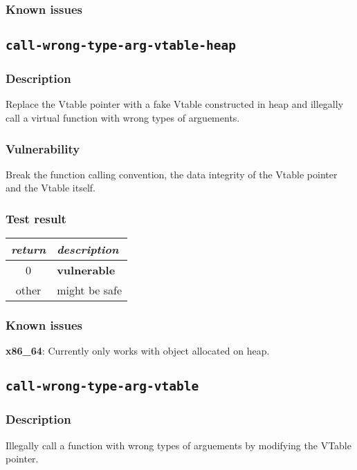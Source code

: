 \documentclass[a4paper]{book}
\begin{document}
\subsubsection{Known issues}

\newpage
\subsection{\texttt{call-wrong-type-arg-vtable-heap}}\label{test-call-wrong-type-arg-vtable-heap}

\subsubsection{Description}
Replace the Vtable pointer with a fake Vtable constructed in heap and
illegally call a virtual function with wrong types of arguements.

\subsubsection{Vulnerability}
Break the function calling convention, the data integrity of the Vtable pointer and the Vtable itself.

\subsubsection{Test result}
\begin{tabular}{cl}
  \toprule
  \emph{return}  & \emph{description} \\
  \midrule
  0              & \textbf{vulnerable} \\
  other          & might be safe \\
  \bottomrule
\end{tabular}

\subsubsection{Known issues}
\textbf{x86\_64}: Currently only works with object allocated on heap.

\newpage
\subsection{\texttt{call-wrong-type-arg-vtable}}\label{test-call-wrong-type-arg-vtable}

\subsubsection{Description}
Illegally call a function with wrong types of arguements by modifying the VTable pointer.
\end{document}
